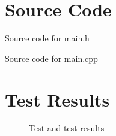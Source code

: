 \documentclass[12pt]{article}
\begin{document}
\maketitle
\pagebreak


\section{Source Code}

Source code for \textsf{main.h}



Source code for \textsf{main.cpp}

\newpage



\section{Test Results}

\begin{figure}[h]
    
    \caption{Test and test results}
    \label{fig:results}
\end{figure}
\end{document}
